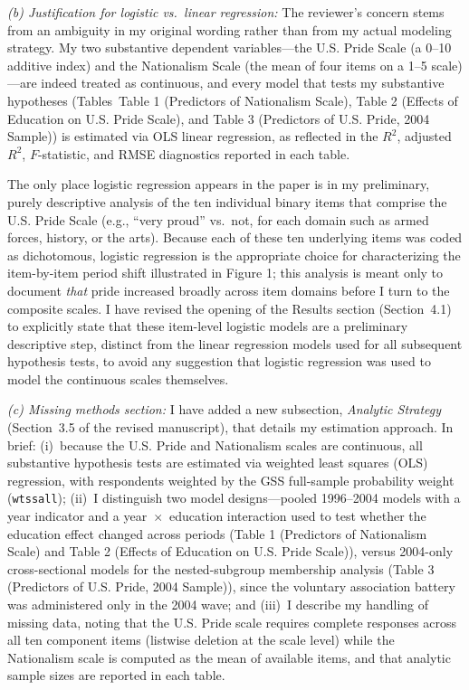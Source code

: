 \documentclass[11pt]{article}
\begin{document}
\textit{(b) Justification for logistic vs.\ linear regression:} The reviewer's concern stems from an ambiguity in my original wording rather than from my actual modeling strategy. My two substantive dependent variables---the U.S. Pride Scale (a 0--10 additive index) and the Nationalism Scale (the mean of four items on a 1--5 scale)---are indeed treated as continuous, and every model that tests my substantive hypotheses (Tables~Table 1 (Predictors of Nationalism Scale), Table 2 (Effects of Education on U.S. Pride Scale), and Table 3 (Predictors of U.S. Pride, 2004 Sample)) is estimated via OLS linear regression, as reflected in the $R^2$, adjusted $R^2$, $F$-statistic, and RMSE diagnostics reported in each table.

The only place logistic regression appears in the paper is in my preliminary, purely descriptive analysis of the ten individual binary items that comprise the U.S. Pride Scale (e.g., ``very proud'' vs.\ not, for each domain such as armed forces, history, or the arts). Because each of these ten underlying items was coded as dichotomous, logistic regression is the appropriate choice for characterizing the item-by-item period shift illustrated in Figure 1; this analysis is meant only to document \textit{that} pride increased broadly across item domains before I turn to the composite scales. I have revised the opening of the Results section (Section~4.1) to explicitly state that these item-level logistic models are a preliminary descriptive step, distinct from the linear regression models used for all subsequent hypothesis tests, to avoid any suggestion that logistic regression was used to model the continuous scales themselves.

\textit{(c) Missing methods section:} I have added a new subsection, \textit{Analytic Strategy} (Section~3.5 of the revised manuscript), that details my estimation approach. In brief: (i)~because the U.S. Pride and Nationalism scales are continuous, all substantive hypothesis tests are estimated via weighted least squares (OLS) regression, with respondents weighted by the GSS full-sample probability weight (\texttt{wtssall}); (ii)~I distinguish two model designs---pooled 1996--2004 models with a year indicator and a year~$\times$~education interaction used to test whether the education effect changed across periods (Table 1 (Predictors of Nationalism Scale) and Table 2 (Effects of Education on U.S. Pride Scale)), versus 2004-only cross-sectional models for the nested-subgroup membership analysis (Table 3 (Predictors of U.S. Pride, 2004 Sample)), since the voluntary association battery was administered only in the 2004 wave; and (iii)~I describe my handling of missing data, noting that the U.S. Pride scale requires complete responses across all ten component items (listwise deletion at the scale level) while the Nationalism scale is computed as the mean of available items, and that analytic sample sizes are reported in each table.
\end{document}
